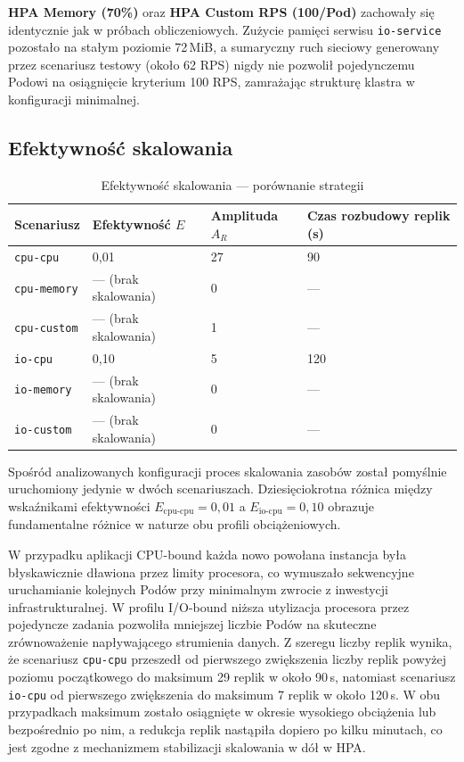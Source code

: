 \textbf{HPA Memory (70\%)} oraz \textbf{HPA Custom RPS (100/Pod)} zachowały się identycznie jak w próbach obliczeniowych. Zużycie pamięci serwisu \texttt{io-service} pozostało na stałym poziomie 72\,MiB, a sumaryczny ruch sieciowy generowany przez scenariusz testowy (około 62 RPS) nigdy nie pozwolił pojedynczemu Podowi na osiągnięcie kryterium 100 RPS, zamrażając strukturę klastra w konfiguracji minimalnej.

\subsection{Efektywność skalowania}

\begin{table}[H]
  \centering
  \begin{tabularx}{\textwidth}{|l|X|X|X|}
    \hline
    \textbf{Scenariusz} & \textbf{Efektywność $E$} & \textbf{Amplituda $A_R$} & \textbf{Czas rozbudowy replik (s)} \\
    \hline
    \texttt{cpu-cpu} & 0,01 & 27 & 90 \\
    \texttt{cpu-memory} & — (brak skalowania) & 0 & — \\
    \texttt{cpu-custom} & — (brak skalowania) & 1 & — \\
    \texttt{io-cpu} & 0,10 & 5 & 120 \\
    \texttt{io-memory} & — (brak skalowania) & 0 & — \\
    \texttt{io-custom} & — (brak skalowania) & 0 & — \\
    \hline
  \end{tabularx}
  \caption{Efektywność skalowania — porównanie strategii}
  \label{tab:efficiency}
\end{table}

Spośród analizowanych konfiguracji proces skalowania zasobów został pomyślnie uruchomiony jedynie w dwóch scenariuszach. Dziesięciokrotna różnica między wskaźnikami efektywności $E_{\text{cpu-cpu}} = 0{,}01$ a $E_{\text{io-cpu}} = 0{,}10$ obrazuje fundamentalne różnice w naturze obu profili obciążeniowych. 

W przypadku aplikacji CPU-bound każda nowo powołana instancja była błyskawicznie dławiona przez limity procesora, co wymuszało sekwencyjne uruchamianie kolejnych Podów przy minimalnym zwrocie z inwestycji infrastrukturalnej. W profilu I/O-bound niższa utylizacja procesora przez pojedyncze zadania pozwoliła mniejszej liczbie Podów na skuteczne zrównoważenie napływającego strumienia danych. Z szeregu liczby replik wynika, że scenariusz \texttt{cpu-cpu} przeszedł od pierwszego zwiększenia liczby replik powyżej poziomu początkowego do maksimum 29 replik w około 90\,s, natomiast scenariusz \texttt{io-cpu} od pierwszego zwiększenia do maksimum 7 replik w około 120\,s. W obu przypadkach maksimum zostało osiągnięte w okresie wysokiego obciążenia lub bezpośrednio po nim, a redukcja replik nastąpiła dopiero po kilku minutach, co jest zgodne z mechanizmem stabilizacji skalowania w dół w HPA.

